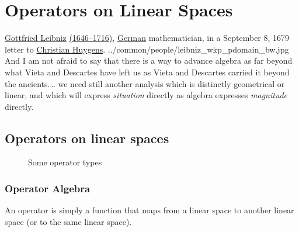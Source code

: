 ﻿%
\chapter{Operators on Linear Spaces}
\label{chp:operator}
\qboxnps
  {\href{http://en.wikipedia.org/wiki/Gottfried_Leibniz}{Gottfried Leibniz}
   \href{http://www-history.mcs.st-andrews.ac.uk/Timelines/TimelineC.html}{(1646--1716)},
   \href{http://www-history.mcs.st-andrews.ac.uk/BirthplaceMaps/Places/Germany.html}{German} mathematician,
   in a September 8, 1679 letter to
   \href{http://en.wikipedia.org/wiki/Christian_Huygens}{Christian Huygens}.
   \footnotemark
  }
  {../common/people/leibniz_wkp_pdomain_bw.jpg}
  {And I am not afraid to say that
   there is a way to advance algebra as far beyond what Vieta and Descartes have left us
   as Vieta and Descartes carried it beyond the ancients.\ldots
   we need still another analysis which is distinctly geometrical or linear,
   and which will express {\em situation} directly as algebra expresses {\em magnitude} directly.}

\section{Operators on linear spaces}
\begin{figure}[t]
  \begin{center}
  
  \caption{Some operator types\label{fig:operator_oplat}}
  \end{center}
\end{figure}%

\subsection{Operator Algebra}
An operator is simply a function that maps from a linear space to another linear space (or to the same linear space).

